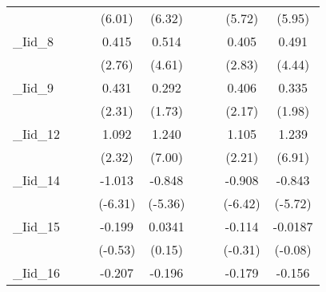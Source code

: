 {\begin{tabular}{l*{8}{c}}
            &                     &                     &      (6.01)         &      (6.32)         &                     &                     &      (5.72)         &      (5.95)         \\
[1em]
\_Iid\_8      &                     &                     &       0.415\sym{**} &       0.514\sym{***}&                     &                     &       0.405\sym{**} &       0.491\sym{***}\\
            &                     &                     &      (2.76)         &      (4.61)         &                     &                     &      (2.83)         &      (4.44)         \\
[1em]
\_Iid\_9      &                     &                     &       0.431\sym{*}  &       0.292         &                     &                     &       0.406\sym{*}  &       0.335\sym{*}  \\
            &                     &                     &      (2.31)         &      (1.73)         &                     &                     &      (2.17)         &      (1.98)         \\
[1em]
\_Iid\_12     &                     &                     &       1.092\sym{*}  &       1.240\sym{***}&                     &                     &       1.105\sym{*}  &       1.239\sym{***}\\
            &                     &                     &      (2.32)         &      (7.00)         &                     &                     &      (2.21)         &      (6.91)         \\
[1em]
\_Iid\_14     &                     &                     &      -1.013\sym{***}&      -0.848\sym{***}&                     &                     &      -0.908\sym{***}&      -0.843\sym{***}\\
            &                     &                     &     (-6.31)         &     (-5.36)         &                     &                     &     (-6.42)         &     (-5.72)         \\
[1em]
\_Iid\_15     &                     &                     &      -0.199         &      0.0341         &                     &                     &      -0.114         &     -0.0187         \\
            &                     &                     &     (-0.53)         &      (0.15)         &                     &                     &     (-0.31)         &     (-0.08)         \\
[1em]
\_Iid\_16     &                     &                     &      -0.207         &      -0.196         &                     &                     &      -0.179         &      -0.156         \\

\end{tabular}}
